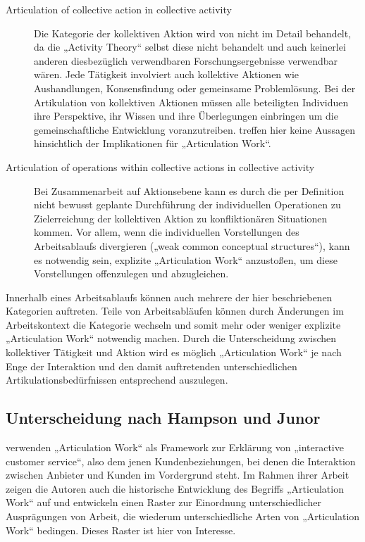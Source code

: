 \begin{description}
	\item[Articulation of collective action in collective activity] Die Kategorie der kollektiven Aktion wird von \citep{Fjuk97} nicht im Detail behandelt, da die „Activity Theory“ selbst diese nicht behandelt und auch keinerlei anderen diesbezüglich verwendbaren Forschungsergebnisse verwendbar wären. Jede Tätigkeit involviert auch kollektive Aktionen wie Aushandlungen, Konsensfindung oder gemeinsame Problemlösung. Bei der Artikulation von kollektiven Aktionen müssen alle beteiligten Individuen ihre Perspektive, ihr Wissen und ihre Überlegungen einbringen um die gemeinschaftliche Entwicklung voranzutreiben. \citet{Fjuk97} treffen hier keine Aussagen hinsichtlich der Implikationen für „Articulation Work“.
	\item[Articulation of operations within collective actions in collective activity] Bei Zusammenarbeit auf Aktionsebene kann es durch die per Definition nicht bewusst geplante Durchführung der individuellen Operationen zu Zielerreichung der kollektiven Aktion zu konfliktionären Situationen kommen. Vor allem, wenn die individuellen Vorstellungen des Arbeitsablaufs divergieren („weak common conceptual structures“), kann es notwendig sein, explizite „Articulation Work“ anzustoßen, um diese Vorstellungen offenzulegen und abzugleichen.
\end{description}

Innerhalb eines Arbeitsablaufs können auch mehrere der hier beschriebenen Kategorien auftreten. Teile von Arbeitsabläufen können durch Änderungen im Arbeitskontext die Kategorie wechseln und somit mehr oder weniger explizite „Articulation Work“ notwendig machen. Durch die Unterscheidung zwischen kollektiver Tätigkeit und Aktion wird es möglich „Articulation Work“ je nach Enge der Interaktion und den damit auftretenden unterschiedlichen Artikulationsbedürfnissen entsprechend auszulegen.

\subsection{Unterscheidung nach Hampson und Junor}
\label{sub:arten_hampson}

\citet{Hampson05} verwenden „Articulation Work“ als Framework zur Erklärung von „interactive customer service“, also dem jenen Kundenbeziehungen, bei denen die Interaktion zwischen Anbieter und Kunden im Vordergrund steht. Im Rahmen ihrer Arbeit zeigen die Autoren auch die historische Entwicklung des Begriffs „Articulation Work“ auf und entwickeln einen Raster zur Einordnung unterschiedlicher Ausprägungen von Arbeit, die wiederum unterschiedliche Arten von „Articulation Work“ bedingen. Dieses Raster ist hier von Interesse.

